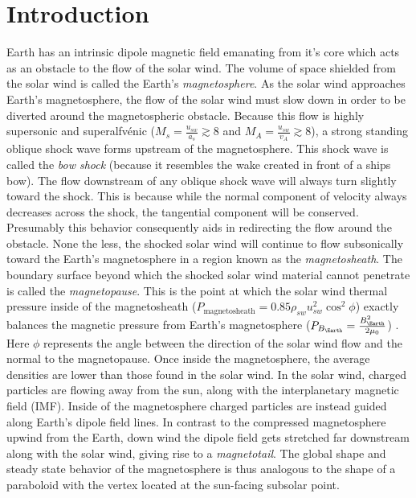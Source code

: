 \documentclass[12pt, letterpaper]{article}
\begin{document}
\section{Introduction}
\label{sec:introduction}
Earth has an intrinsic dipole magnetic field emanating from it's core which acts as an obstacle to the flow of the solar wind. The volume of space shielded from the solar wind is called the Earth's \emph{magnetosphere}. As the solar wind approaches Earth's magnetosphere, the flow of the solar wind must slow down in order to be diverted around the magnetospheric obstacle. Because this flow is highly supersonic and superalfv\'{e}nic ($M_{s} = \frac{u_{sw}}{a_{s}} \gtrsim 8$ and $M_{A} = \frac{u_{sw}}{v_{A}} \gtrsim 8$), a strong standing oblique shock wave forms upstream of the magnetosphere. This shock wave is called the \emph{bow shock} (because it resembles the wake created in front of a ships bow). The flow downstream of any oblique shock wave will always turn slightly toward the shock. This is because while the normal component of velocity always decreases across the shock, the tangential component will be conserved. Presumably this behavior consequently aids in redirecting the flow around the obstacle. None the less, the shocked solar wind will continue to flow subsonically toward the Earth's magnetosphere in a region known as the \emph{magnetosheath}. The boundary surface beyond which the shocked solar wind material cannot penetrate is called the \emph{magnetopause}. This is the point at which the solar wind thermal pressure inside of the magnetosheath ($P_{\text{magnetosheath}} = 0.85 \rho _{sw} u^{2}_{sw} \cos ^{2} \phi$) exactly balances the magnetic pressure from Earth's magnetosphere ($P_{B_{\Earth}} = \frac{B^{2}_{\Earth}}{2 \mu _{0}}$) \citep{Cravens97}. Here $\phi$ represents the angle between the direction of the solar wind flow and the normal to the magnetopause. Once inside the magnetosphere, the average densities are lower than those found in the solar wind. In the solar wind, charged particles are flowing away from the sun, along with the interplanetary magnetic field (IMF). Inside of the magnetosphere charged particles are instead guided along Earth's dipole field lines. In contrast to the compressed magnetosphere upwind from the Earth, down wind the dipole field gets stretched far downstream along with the solar wind, giving rise to a \emph{magnetotail}. The global shape and steady state behavior of the magnetosphere is thus analogous to the shape of a paraboloid with the vertex located at the sun-facing subsolar point.
\end{document}
